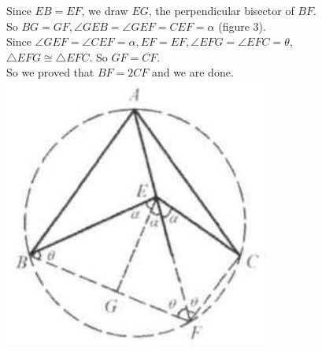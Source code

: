 \documentclass{article}
\begin{document}
Since \(E B=E F\), we draw \(E G\), the perpendicular bisector of \(B F\).\\
So \(B G=G F, \angle G E B=\angle G E F=C E F=\alpha\) (figure 3).\\
Since \(\angle G E F=\angle C E F=\alpha, E F=E F, \angle E F G=\angle E F C=\theta\),\\
\(\triangle E F G \cong \triangle E F C\). So \(G F=C F\).\\
So we proved that \(B F=2 C F\) and we are done.\\
\centering
\includegraphics[width=\textwidth]{images/202(3).jpg}
\end{document}
